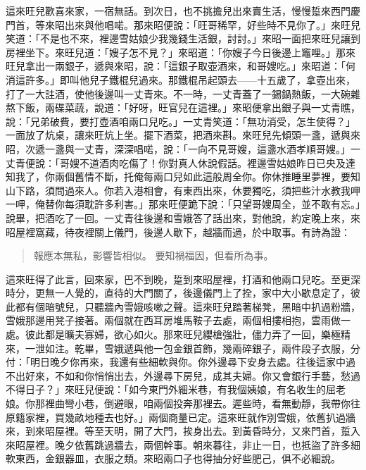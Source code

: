 這來旺兒歡喜來家，一宿無話。到次日，也不挑擔兒出來賣生活，慢慢踅來西門慶門首，等來昭出來與他唱喏。那來昭便說：「旺哥稀罕，好些時不見你了。」來旺兒笑道：「不是也不來，裡邊雪姑娘少我幾錢生活銀，討討。」來昭一面把來旺兒讓到房裡坐下。來旺兒道：「嫂子怎不見？」來昭道：「你嫂子今日後邊上竈哩。」那來旺兒拿出一兩銀子，遞與來昭，說：「這銀子取壺酒來，和哥嫂吃。」來昭道：「何消這許多。」即叫他兒子鐵棍兒過來。那鐵棍吊起頭去——十五歲了，拿壺出來，打了一大註酒，使他後邊叫一丈青來。不一時，一丈青蓋了一錫鍋熱飯，一大碗雜熬下飯，兩碟菜蔬，說道：「好呀，旺官兒在這裡。」來昭便拿出銀子與一丈青瞧，說：「兄弟破費，要打壺酒咱兩口兒吃。」一丈青笑道：「無功消受，怎生使得？」一面放了炕桌，讓來旺炕上坐。擺下酒菜，把酒來斟。來旺兒先傾頭一盞，遞與來昭，次遞一盞與一丈青，深深唱喏，說：「一向不見哥嫂，這盞水酒孝順哥嫂。」一丈青便說：「哥嫂不道酒肉吃傷了！你對真人休說假話。裡邊雪姑娘昨日已央及達知我了，你兩個舊情不斷，托俺每兩口兒如此這般周全你。你休推睡里夢裡，要知山下路，須問過來人。你若入港相會，有東西出來，休要獨吃，須把些汁水教我呷一呷，俺替你每須耽許多利害。」那來旺便跪下說：「只望哥嫂周全，並不敢有忘。」說畢，把酒吃了一回。一丈青往後邊和雪娥答了話出來，對他說，約定晚上來，來昭屋裡窩藏，待夜裡關上儀門，後邊人歇下，越牆而過，於中取事。有詩為證：
\begin{quote}
報應本無私，影響皆相似。
要知禍福因，但看所為事。
\end{quote}

這來旺得了此言，回來家，巴不到晚，踅到來昭屋裡，打酒和他兩口兒吃。至更深時分，更無一人覺的，直待的大門關了，後邊儀門上了拴，家中大小歇息定了，彼此都有個暗號兒，只聽牆內雪娥咳嗽之聲。這來旺兒踏著梯凳，黑暗中扒過粉牆，雪娥那邊用凳子接著。兩個就在西耳房堆馬鞍子去處，兩個相摟相抱，雲雨做一處。彼此都是曠夫寡婦，欲心如火。那來旺兒纓槍強壯，儘力弄了一回，樂極精來，一泄如注。乾畢，雪娥遞與他一包金銀首飾，幾兩碎銀子，兩件段子衣服，分付：「明日晚夕你再來，我還有些細軟與你。你外邊尋下安身去處。往後這家中過不出好來，不如和你悄悄出去，外邊尋下房兒，成其夫婦。你又會銀行手藝，愁過不得日子？」來旺兒便說：「如今東門外細米巷，有我個姨娘，有名收生的屈老娘。你那裡曲彎小巷，倒避眼，咱兩個投奔那裡去。遲些時，看無動靜，我帶你往原籍家裡，買幾畝地種去也好。」兩個商量已定。這來旺就作別雪娥，依舊扒過牆來，到來昭屋裡。等至天明，開了大門，挨身出去。到黃昏時分，又來門首，踅入來昭屋裡。晚夕依舊跳過牆去，兩個幹事。朝來暮往，非止一日，也抵盜了許多細軟東西，金銀器皿，衣服之類。來昭兩口子也得抽分好些肥己，俱不必細說。

